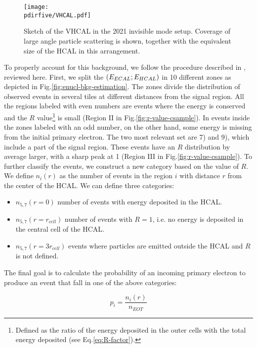 \begin{figure}[bth!]
  \centering
  \texttt{[image: \\pdirfive/VHCAL.pdf]}
  \caption[Sketch of VHCAL in invisible mode setup 2021]{Sketch of the VHCAL in the 2021 invisible mode setup. Coverage of large angle particle scattering is shown, together with the equivalent size of the HCAL in this arrangement.}
  \label{fig:vhcal}
\end{figure}

To properly account for this background, we follow the procedure described in \cite{na64-neutrals-study,pdegen-thesis}, reviewed here.
First, we split the $(E_{ECAL};E_{HCAL})$ in 10 different zones as depicted in Fig.\ref{fig:enucl-bkg-estimation}. The zones divide the distribution of observed events in several tiles at different distances from the signal region. All the regions labeled with even numbers are events where the energy is conserved and the $R$ value\footnote{Defined as the ratio of the energy deposited in the outer cells with the total energy deposited (see Eq.\ref{eq:R-factor}).} is small (Region II in Fig.\ref{fig:r-value-csample}). In events inside the zones labeled with an odd number, on the other hand, some energy is missing from the initial primary electron. The two most relevant set are 7) and 9), which include a part of the signal region. These events have an $R$ distribution by average larger, with a sharp peak at 1 (Region III in Fig.\ref{fig:r-value-csample}). To further classify the events, we construct a new category based on the value of $R$. We define $n_i(r)$ as the number of events in the region $i$ with distance $r$ from the center of the HCAL. We can define three categories:

\begin{itemize}
\item $n_{5,7}(r=0)$ number of events with energy deposited in the HCAL.
\item $n_{5,7}(r=r_{cell})$ number of events with $R=1$, i.e. no energy is deposited in the central cell of the HCAL.
\item $n_{5,7}(r=3r_{cell})$ events where particles are emitted outside the HCAL and $R$ is not defined.
\end{itemize}

The final goal is to calculate the probability of an incoming primary electron to produce an event that fall in one of the above categories:

\begin{equation}
  \label{eq:enucl-prob}
  p_i = \frac{n_i(r)}{n_{EOT}}
\end{equation}

